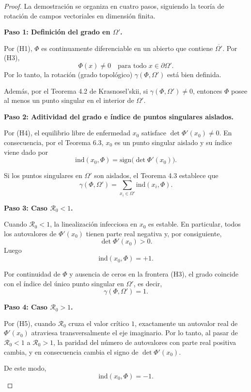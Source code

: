 \documentclass{article}
\numberwithin{equation}{section}
\begin{document}
\begin{proof}
La demostración se organiza en cuatro pasos, siguiendo la teoría de rotación de campos vectoriales en dimensión finita.

\medskip
\noindent
\textbf{Paso 1: Definición del grado en $\Omega'$.}

Por (H1), $\Phi$ es continuamente diferenciable en un abierto que contiene
$\overline{\Omega'}$. Por (H3), 
\[
\Phi(x) \neq 0 \quad \text{para todo } x \in \partial \Omega'.
\]
Por lo tanto, la rotación (grado topológico) $\gamma(\Phi,\Omega')$ está bien definida.

Además, por el Teorema 4.2 de Krasnosel’skii, si 
$\gamma(\Phi,\Omega') \neq 0$, entonces $\Phi$ posee al menos un punto singular
en el interior de $\Omega'$.

\medskip
\noindent
\textbf{Paso 2: Aditividad del grado e índice de puntos singulares aislados.}

Por (H4), el equilibrio libre de enfermedad $x_0$ satisface
$\det \Phi'(x_0)\neq 0$. En consecuencia, por el Teorema 6.3,
$x_0$ es un punto singular aislado y su índice viene dado por
\[
\mathrm{ind}(x_0,\Phi)
= \mathrm{sign}\big(\det \Phi'(x_0)\big).
\]

Si los puntos singulares en $\Omega'$ son aislados, el Teorema 4.3 establece que
\[
\gamma(\Phi,\Omega')
=
\sum_{x_i \in \Omega'} \mathrm{ind}(x_i,\Phi).
\]

\medskip
\noindent
\textbf{Paso 3: Caso $\mathcal R_0 < 1$.}

Cuando $\mathcal R_0 < 1$, la linealización infecciosa en $x_0$
es estable. En particular, todos los autovalores de $\Phi'(x_0)$
tienen parte real negativa y, por consiguiente,
\[
\det \Phi'(x_0) > 0.
\]
Luego
\[
\mathrm{ind}(x_0,\Phi)=+1.
\]

Por continuidad de $\Phi$ y ausencia de ceros en la frontera
(H3), el grado coincide con el índice del único punto singular
en $\Omega'$, es decir,
\[
\gamma(\Phi,\Omega')=1.
\]

\medskip
\noindent
\textbf{Paso 4: Caso $\mathcal R_0 > 1$.}

Por (H5), cuando $\mathcal R_0$ cruza el valor crítico $1$,
exactamente un autovalor real de $\Phi'(x_0)$ atraviesa
transversalmente el eje imaginario.
Por lo tanto, al pasar de $\mathcal R_0<1$ a $\mathcal R_0>1$,
la paridad del número de autovalores con parte real positiva cambia,
y en consecuencia cambia el signo de $\det \Phi'(x_0)$.

De este modo,
\[
\mathrm{ind}(x_0,\Phi)=-1.
\]


\end{proof}
\end{document}
